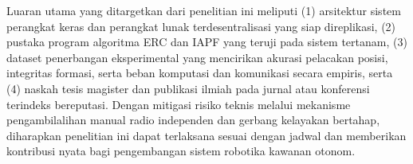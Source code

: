 \documentclass[12pt,a4paper]{report}
\begin{document}
Luaran utama yang ditargetkan dari penelitian ini meliputi (1) arsitektur sistem perangkat keras dan perangkat lunak terdesentralisasi yang siap direplikasi, (2) pustaka program algoritma ERC dan IAPF yang teruji pada sistem tertanam, (3) dataset penerbangan eksperimental yang mencirikan akurasi pelacakan posisi, integritas formasi, serta beban komputasi dan komunikasi secara empiris, serta (4) naskah tesis magister dan publikasi ilmiah pada jurnal atau konferensi terindeks bereputasi. Dengan mitigasi risiko teknis melalui mekanisme pengambilalihan manual radio independen dan gerbang kelayakan bertahap, diharapkan penelitian ini dapat terlaksana sesuai dengan jadwal dan memberikan kontribusi nyata bagi pengembangan sistem robotika kawanan otonom.

\clearpage
\renewcommand{\bibname}{DAFTAR PUSTAKA} %




\end{document}
